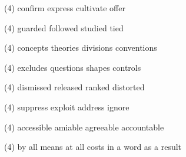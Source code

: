 \begin{tasks}(4)
	\task confirm
	\task express
	\task cultivate
	\task offer
\end{tasks}
\item
\begin{tasks}(4)
	\task guarded
	\task followed
	\task studied
	\task tied
\end{tasks}
\item
\begin{tasks}(4)
	\task concepts
	\task theories
	\task divisions
	\task conventions
\end{tasks}
\item
\begin{tasks}(4)
	\task excludes
	\task questions
	\task shapes
	\task controls
\end{tasks}
\item
\begin{tasks}(4)
	\task dismissed
	\task released
	\task ranked
	\task distorted
\end{tasks}
\item
\begin{tasks}(4)
	\task suppress
	\task exploit
	\task address
	\task ignore
\end{tasks}
\item
\begin{tasks}(4)
	\task accessible
	\task amiable
	\task agreeable
	\task accountable
\end{tasks}
\item
\begin{tasks}(4)
	\task by all means
	\task at all costs
	\task in a word
	\task as a result
\end{tasks}